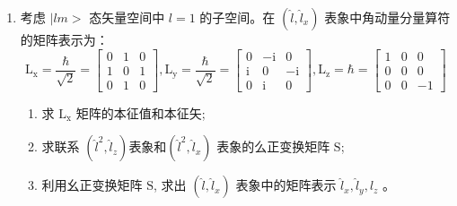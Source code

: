 \begin{enumerate}
\item 
考虑 $\mid lm>$ 态矢量空间中 $l=1$ 的子空间。在 $\left(\hat{l}, \hat{l}_{x}\right)$ 表象中角动量分量算符的矩阵表示为：
$$
\mathrm{L}_{\mathrm{x}}=\frac{\hbar}{\sqrt{2}}=\left[\begin{array}{lll}
	0 & 1 & 0 \\
	1 & 0 & 1 \\
	0 & 1 & 0
\end{array}\right], \mathrm{L}_{\mathrm{y}}=\frac{\hbar}{\sqrt{2}}=\left[\begin{array}{ccc}
	0 & -\mathrm{i} & 0 \\
	\mathrm{i} & 0 & -\mathrm{i} \\
	0 & \mathrm{i} & 0
\end{array}\right], \mathrm{L}_{\mathrm{z}}=\hbar=\left[\begin{array}{ccc}
	1 & 0 & 0 \\
	0 & 0 & 0 \\
	0 & 0 & -1
\end{array}\right]
$$
\begin{enumerate}
	\item
	求 $\mathrm{L}_{\mathrm{x}}$ 矩阵的本征值和本征矢;
	\item 
	求联系 $\left(\hat{l}^{2}, \hat{l}_{z}\right)$表象和$\left(\hat{l}^{2}, \hat{l}_{x}\right)$ 表象的么正变换矩阵 $\mathrm{S}$;
	\item 
	利用幺正变换矩阵 $\mathrm{S}$, 求出 $\left(\hat{l}, \hat{l}_{x}\right)$ 表象中的矩阵表示 $\hat{l}_{x}, \hat{l}_{y}, \hat{l}_{z}$ 。
	
	
	
\end{enumerate}
\banswer{
	
}


\end{enumerate}
